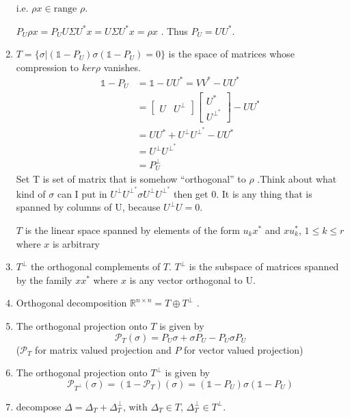 \documentclass{article}
\begin{document}
\begin{enumerate}
i.e. $\rho x \in \text{range } \rho$.

$P_U\rho x = P_UU\Sigma U^*x=U\Sigma U^*x = \rho x$ . Thus $P_U= UU^*$.

 
\item $T = \{ \sigma | (\mathbb{1} - P_U) \sigma(\mathbb{1} - P_U) = 0 \}$ is the space of matrices whose {\color{red} compression} to $ker \rho$ vanishes. 
\begin{align*}
\mathbb{1}-P_U &= \mathbb{1}-UU^* = VV^* - UU^*\\
&= \begin{bmatrix}
U & U^{\perp}
\end{bmatrix}\begin{bmatrix}
U^* \\U^{\perp^*}
\end{bmatrix}-UU^*\\
&=UU^*+U^\perp U^{\perp^*}-UU^*\\
&=U^\perp U^{\perp^*}\\
&=P_U^\perp
\end{align*}
Set T is set of matrix that is somehow ``orthogonal'' to $\rho$
.Think about what kind of $\sigma$ can I put in  $U^\perp
 U^{\perp^*}\sigma U^\perp U^{\perp^*}$ then get 0. It is any thing that is spanned by columns of U, because $U^\perp U = 0$. 
 
$T$ is the linear space spanned by elements of the form $u_k x^*$ and $xu_k^*$, $1 \le k \le r$ where $x$ is arbitrary
 
\item $T^\perp$ the orthogonal complements of $T$. $T^\perp$ is the subspace of matrices spanned by the family $xx^*$ where $x$ is any vector orthogonal to U.

\item Orthogonal decomposition $\mathbb{R}^{n\times n} = T \oplus T^\perp$ .

\item The orthogonal projection onto $T$ is given by
\[
\mathcal{P}_T(\sigma) = P_U \sigma + \sigma P_U - P_U \sigma P_U
\]
 ($\mathcal{P}_T$ for matrix valued projection and $P$ for vector valued projection)
 


\item The orthogonal projection onto $T^\perp$ is given by 
\[\mathcal{P}_{T^\perp}(\sigma)=(\mathbb{1}-\mathcal{P}_T)(\sigma)=(\mathbb{1}-P_U)\sigma(\mathbb{1}-P_U)
\]

\item decompose $\Delta = \Delta_T + \Delta_{T}^\perp$, with $\Delta_T \in T$, $\Delta_T^\perp \in T^\perp$.


\end{enumerate}
\end{document}
